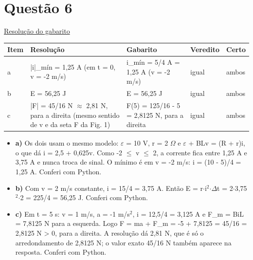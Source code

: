 \documentclass{article}%
\begin{document}
\section*{Questão 6}%
\href{https://poliedroresolve.sistemapoliedro.com.br/vestibulares/ime/2026/ime-2-fase-dia-2-24-10-2025-2-fase-dia-2/dissertativa-6-fisica-2-fase-dia-2-ime-2026}{Resolução do gabarito}\par\smallskip%
\begin{longtable}{@{}p{} p{} p{} p{} p{}@{}}\toprule Item & Resolução & Gabarito & Veredito & Certo \\ \midrule
a & |i|\_mín = 1,25 A (em t = 0, v = -2 m/s) & i\_mín = 5/4 A = 1,25 A (v = -2 m/s) & igual & ambos \\
b & E = 56,25 J & E = 56,25 J & igual & ambos \\
c & |F| = 45/16 N $\approx$ 2,81 N, para a direita (mesmo sentido de v e da seta F da Fig. 1) & F(5) = 125/16 - 5 = 2,8125 N, para a direita & igual & ambos \\
\bottomrule\end{longtable}%
\begin{itemize}%
\item%
\textbf{a)} Os dois usam o mesmo modelo: $\varepsilon$ = 10 V, r = 2 $\Omega$ e $\varepsilon$ + BLv = (R + r)i, o que dá i = 2,5 + 0,625v. Como -2 $\leq$ v $\leq$ 2, a corrente fica entre 1,25 A e 3,75 A e nunca troca de sinal. O mínimo é em v = -2 m/s: i = (10 - 5)/4 = 1,25 A. Conferi com Python.%
\item%
\textbf{b)} Com v = 2 m/s constante, i = 15/4 = 3,75 A. Então E = r$\cdot$i$^2$$\cdot$$\Delta$t = 2$\cdot$3,75$^2$$\cdot$2 = 225/4 = 56,25 J. Conferi com Python.%
\item%
\textbf{c)} Em t = 5 s: v = 1 m/s, a = -1 m/s$^2$, i = 12,5/4 = 3,125 A e F\_m = BiL = 7,8125 N para a esquerda. Logo F = ma + F\_m = -5 + 7,8125 = 45/16 = 2,8125 N > 0, para a direita. A resolução dá 2,81 N, que é só o arredondamento de 2,8125 N; o valor exato 45/16 N também aparece na resposta. Conferi com Python.%
\end{itemize}%
\end{document}
